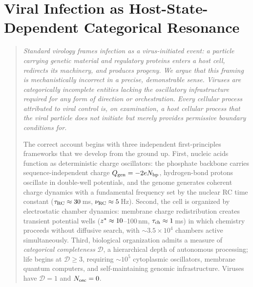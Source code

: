 
\chapter{Viral Infection as Host-State-Dependent Categorical Resonance}
\label{v:ch:pathogenic-viruses}

\begin{quote}\small\itshape
Standard virology frames infection as a virus-initiated event: a particle carrying genetic material and regulatory proteins enters a host cell, redirects its machinery, and produces progeny. We argue that this framing is mechanistically incorrect in a precise, demonstrable sense. Viruses are \emph{categorically incomplete} entities lacking the oscillatory infrastructure required for any form of direction or orchestration. Every cellular process attributed to viral control is, on examination, a host cellular process that the viral particle does not initiate but merely provides permissive boundary conditions for.

The correct account begins with three independent first-principles frameworks that we develop from the ground up. First, nucleic acids function as deterministic charge oscillators: the phosphate backbone carries sequence-independent charge $Q_{\mathrm{gen}} = -2e N_{\mathrm{bp}}$, hydrogen-bond protons oscillate in double-well potentials, and the genome generates coherent charge dynamics with a fundamental frequency set by the nuclear RC time constant ($\tau_{\mathrm{RC}} \approx 30$\,ms, $\nu_{\mathrm{RC}} \approx 5$\,Hz). Second, the cell is organized by electrostatic chamber dynamics: membrane charge redistribution creates transient potential wells ($z^{*} \approx 10$--100\,nm, $\tau_{\mathrm{ch}} \approx 1$\,ms) in which chemistry proceeds without diffusive search, with $\sim\!3.5\times10^{4}$ chambers active simultaneously. Third, biological organization admits a measure of \emph{categorical completeness} $\mathcal{D}$, a hierarchical depth of autonomous processing; life begins at $\mathcal{D}\geq 3$, requiring $\sim\!10^5$ cytoplasmic oscillators, membrane quantum computers, and self-maintaining genomic infrastructure. Viruses have $\mathcal{D}=1$ and $N_{\mathrm{osc}} = 0$.


\end{quote}
